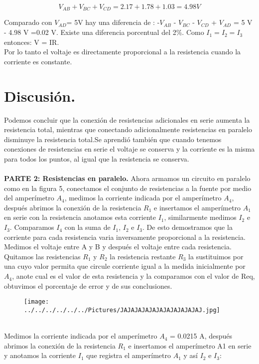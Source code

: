 \documentclass[11pt,a4paper]{article}
\begin{document}
       \[{V}_{AB} + {V}_{BC} + {V}_{CD} =2.17 + 1.78 + 1.03=4.98 V\]

Comparado con ${V}_{AD}$= 5V hay una diferencia de : -${V}_{AB}$ - ${V}_{BC}$ - ${V}_{CD}$ + ${V}_{AD}$ = 5 V - 4.98 V =0.02 V. Existe una diferencia porcentual del 2$\%$.  Como ${I}_{1}={I}_{2}={I}_{3}$ entonces:  V = IR.\\ 
Por lo tanto el voltaje es directamente proporcional a la resistencia cuando la corriente es constante.
\section*{Discusi\'{o}n.}
Podemos concluir que la conexi\'{o}n de resistencias adicionales en serie aumenta la resistencia total, mientras que conectando adicionalmente resistencias en paralelo disminuye la resistencia total.Se aprendi\'{o} tambi\'{e}n que cuando tenemos conexiones de resistencias en serie el voltaje se conserva y la corriente es la misma para todos los puntos, al igual que la resistencia se conserva.
\\
\\
\textbf{PARTE 2: Resistencias en paralelo.}
Ahora armamos un circuito en paralelo como en la figura 5, conectamos el conjunto de resistencias a la fuente por medio del amper\'{i}metro ${A}_{4}$, medimos la corriente indicada por el amper\'{i}metro ${A}_{4}$, despu\'{e}s abrimos la conexi\'{o}n de la resistencia ${R}_{1}$ e insertamos el amper\'{i}metro ${A}_{1}$ en serie con la resistencia anotamos esta corriente ${I}_{1}$, similarmente medimos ${I}_{2}$ e ${I}_{3}$. Comparamos ${I}_{4}$ con la suma de ${I}_{1}$, ${I}_{2}$ e ${I}_{3}$. De esto demostramos que la corriente para cada resistencia varia inversamente proporcional a la resistencia. Medimos el voltaje entre A y B y despu\'{e}s el voltaje entre cada resistencia. Quitamos las resistencias ${R}_{1}$ y ${R}_{2}$ la resistencia restante ${R}_{3}$ la sustituimos por una cuyo valor permita que circule corriente igual a la medida inicialmente por ${A}_{4}$, anote cual es el valor de esta resistencia y la comparamos con el valor de Req, obtuvimos el porcentaje de error y de sus conclusiones.
\begin{figure}[hbtp]
\centering
\texttt{[image: ../../../../../../Pictures/JAJAJAJAJAJAJAJAJAJAJAJ.jpg]}
\end{figure}
\\
Medimos la corriente indicada por el amper\'{i}metro ${A}_{4}$ = 0.0215 A, despu\'{e}s abrimos la conexi\'{o}n de la resistencia ${R}_{1}$ e insertamos el amper\'{i}metro A1 en serie y anotamos la corriente ${I}_{1}$ que registra el amper\'{i}metro ${A}_{1}$ y as\'{i} ${I}_{2}$ e ${I}_{3}$:
\end{document}
